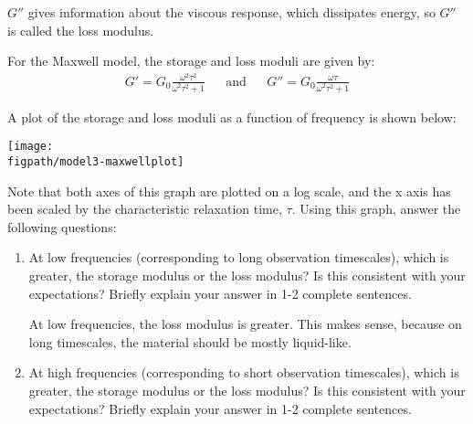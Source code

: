 \begin{activity}
\begin{ctqs}
\begin{solution}[2in]
						$G''$ gives information about the viscous response, which dissipates energy, so $G''$ is called the loss modulus.
					\end{solution}
			
\end{ctqs}

\begin{infobox}
	For the Maxwell model, the storage and loss moduli are given by:
	\begin{align*}
		G' = G_0 \frac{\omega^2 \tau^2}{\omega^2 \tau^2 + 1} && \text{and} && G'' = G_0 \frac{\omega \tau}{\omega^2 \tau^2 + 1}
	\end{align*}
	
\end{infobox}

\clearpage
\begin{ctqs}
	
	\question A plot of the storage and loss moduli as a function of frequency is shown below:
				
		\centerline{\texttt{[image: \\figpath/model3-maxwellplot]}}
	
	Note that both axes of this graph are plotted on a log scale, and the x axis has been scaled by the characteristic relaxation time, $\tau$. 
	Using this graph, answer the following questions:
	
	\begin{enumerate}
		\item  At low frequencies (corresponding to long observation timescales), which is greater, the storage modulus or the loss modulus?  Is this consistent with your expectations?  Briefly explain your answer in 1-2 complete sentences.
	
					\begin{solution}[1.1in]
					
						At low frequencies, the loss modulus is greater.  This makes sense, because on long timescales, the material should be mostly liquid-like.
					
					\end{solution}
	
		\item At high frequencies (corresponding to short observation timescales), which is greater, the storage modulus or the loss modulus?  Is this consistent with your expectations?  Briefly explain your answer in 1-2 complete sentences.
	
					\begin{solution}[1.1in]
					

\end{solution}
\end{enumerate}
\end{ctqs}
\end{activity}
